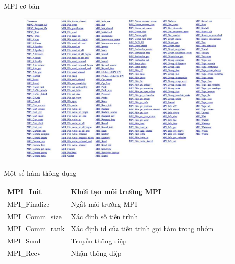 \documentclass[10pt]{beamer}
\theoremstyle{remark}
\numberwithin{algocf}{section}
\numberwithin{equation}{section}
\numberwithin{dl}{section}
\numberwithin{figure}{section}
\begin{document}
\begin{frame}{MPI cơ bản}
    \begin{figure}[H]
        \centering
        \includegraphics[height=0.85\textheight]{figures/MPI/MPI_Full_Routines.png}
    \end{figure}
\end{frame}

\begin{frame}{Một số hàm thông dụng}
    \begin{table}[H]
        \centering
        \begin{tabular}{|l|l|}
            \hline
            MPI\_Init & Khởi tạo môi trường MPI \\
            \hline
            MPI\_Finalize & Ngắt môi trường MPI \\
            \hline
            MPI\_Comm\_size & Xác định số tiến trình \\
            \hline
            MPI\_Comm\_rank & Xác định id của tiến trình gọi hàm trong nhóm \\
            \hline
            MPI\_Send & Truyền thông điệp \\
            \hline
            MPI\_Recv & Nhận thông điệp \\
            \hline
        \end{tabular}
    \end{table}
    
\end{frame}
\end{document}

